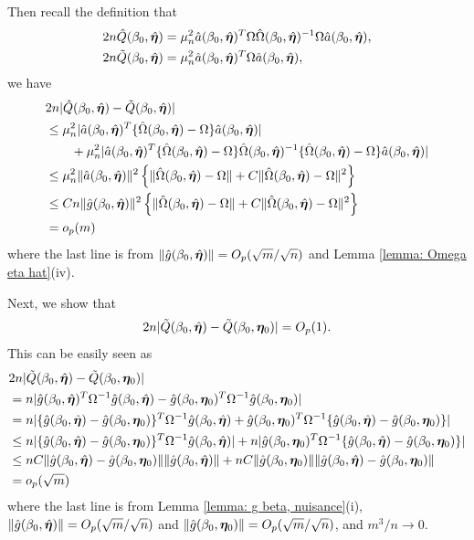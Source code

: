 \documentclass[12pt]{article}
\begin{document}
{Then recall the definition that 
\begin{align*}
	&  2n \hat Q(\beta_0, \hat{\bm \eta})=\mu_n^{2} \hat a(\beta_0, \hat{\bm \eta})^T \Omega \hat\Omega(\beta_0, \hat{\bm \eta})^{-1}\Omega \hat a(\beta_0, \hat{\bm \eta}),\\
	& 2n \tilde Q(\beta_0, \hat{\bm \eta})=\mu_n^{2} \hat a(\beta_0, \hat{\bm \eta})^T \Omega \hat a(\beta_0, \hat{\bm \eta}),
\end{align*}
we have 
\begin{align*}
	&2 n |\hat Q (\beta_0, \hat{\bm \eta})- \tilde{Q} (\beta_0, \hat{\bm \eta}) | \\
	&\leq \mu_n^{2} |\hat a(\beta_0, \hat{\bm \eta})^T \{ \hat\Omega(\beta_0, \hat{\bm \eta}) - \Omega\}\hat a(\beta_0, \hat{\bm \eta})| \\
	&\qquad +\mu_n^{2}  |\hat a(\beta_0, \hat{\bm \eta})^T \{ \hat\Omega(\beta_0, \hat{\bm \eta}) - \Omega\} \hat\Omega(\beta_0, \hat{\bm \eta})^{-1} \{ \hat\Omega(\beta_0, \hat{\bm \eta}) - \Omega\} \hat a(\beta_0, \hat{\bm \eta})  | \\
	&\leq \mu_n^{2}  \|\hat a(\beta_0, \hat{\bm \eta})\|^2 \left\{\| \hat\Omega(\beta_0, \hat{\bm \eta}) - \Omega\| + C\| \hat\Omega(\beta_0, \hat{\bm \eta}) - \Omega\|^2 \right\} \\
	&\leq  C n \| \hat g(\beta_0, \hat{\bm \eta})\|^2  \left\{\| \hat\Omega(\beta_0, \hat{\bm \eta}) - \Omega\| + C\| \hat\Omega(\beta_0, \hat{\bm \eta}) - \Omega\|^2 \right\}  \\
	&= o_p(m ) 
\end{align*}
where the last line is from $ \|\hat g(\beta_0, \hat{\bm \eta}) \| = O_p(\sqrt{m}/\sqrt{n}) $ and Lemma \ref{lemma: Omega eta hat}(iv).


Next, we show that 
\[
2 n |\tilde Q (\beta_0, \hat{\bm \eta})- \tilde{Q} (\beta_0, \bm \eta_0) | =O_p(1).
\]
This can be easily seen as  
\begin{align*}
	& 2 n |\tilde Q (\beta_0, \hat{\bm \eta})- \tilde{Q} (\beta_0, \bm \eta_0) | \\
	&= n|\hat g(\beta_0, \hat{\bm \eta})^T \Omega^{-1} \hat g(\beta_0, \hat{\bm \eta}) - \hat g(\beta_0, \bm \eta_0)^T \Omega ^{-1}\hat g(\beta_0, \bm \eta_0)| \\
	&=  n|\{\hat g(\beta_0, \hat{\bm \eta})-\hat g(\beta_0, \bm \eta_0) \}^T \Omega ^{-1} \hat g(\beta_0, \hat{\bm \eta}) +  \hat g(\beta_0, \bm \eta_0)^T \Omega ^{-1} \{\hat g(\beta_0, \hat{\bm \eta}) - \hat g(\beta_0, \bm \eta_0)\} | \\
	&\leq  n|\{\hat g(\beta_0, \hat{\bm \eta})-\hat g(\beta_0, \bm \eta_0) \}^T \Omega^{-1} \hat g(\beta_0, \hat{\bm \eta}) |+ n | \hat g(\beta_0, \bm \eta_0)^T \Omega ^{-1} \{\hat g(\beta_0, \hat{\bm \eta}) - \hat g(\beta_0, \bm \eta_0)\} | \\
	&\leq n C \|\hat g(\beta_0, \hat{\bm \eta})-\hat g(\beta_0, \bm \eta_0) \| \|\hat g(\beta_0, \hat{\bm \eta}) \|+ n C \| \hat g(\beta_0, \bm \eta_0)\| \| \hat g(\beta_0, \hat{\bm \eta}) - \hat g(\beta_0, \bm \eta_0) \|\\
	& = o_p(\sqrt{m} ) 
\end{align*}
where the last line is from Lemma \ref{lemma: g beta, nuisance}(i),  $ \|\hat g(\beta_0, \hat{\bm \eta}) \| = O_p(\sqrt{m}/\sqrt{n}) $ and $ \|\hat g (\beta_0, \bm \eta_0)\|=O_p(\sqrt{m}/\sqrt{n})$, and $m^3/n\rightarrow 0$. 

}
\end{document}
